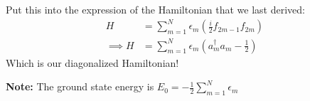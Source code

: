 \documentclass[11pt,a4paper]{article}
\begin{document}
Put this into the expression of the Hamiltonian that we last derived:
\begin{align*}
H &= \sum_{m=1}^{N} \epsilon_m \left( \frac{i}{2} f_{2m-1} f_{2m} \right) \\
\implies H &= \sum_{m=1}^{N} \epsilon_m \left( a_m^\dagger a_m - \frac{1}{2} \right)
\end{align*}
Which is our diagonalized Hamiltonian!

\vspace{0.5cm}
\noindent\textbf{Note:} The ground state energy is $E_0 = -\frac{1}{2} \sum_{m=1}^{N} \epsilon_m$
\end{document}
